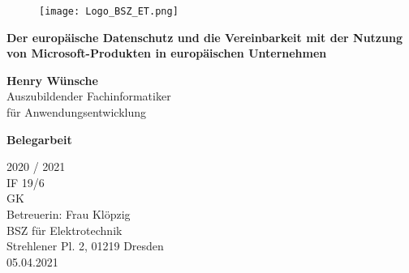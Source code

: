 \begin{titlepage}
    \begin{center}
        \begin{figure}[hbp]
            \begin{center}
                \texttt{[image: Logo\_BSZ\_ET.png]}
            \end{center}
        \end{figure}
        \vspace*{1cm}
        {\huge\textbf{Der europäische Datenschutz und die Vereinbarkeit mit der Nutzung von Microsoft-Produkten in europäischen Unternehmen}}

        \vspace{2cm}

            {\huge\textbf{Henry Wünsche}} \\
            Auszubildender Fachinformatiker \\ für Anwendungsentwicklung

        \vfill
        {\huge\textbf{Belegarbeit}}

        \vspace{1cm}
        {\Huge 2020 / 2021}\\
        \vspace{0.8cm}
        IF 19/6\\
        GK\\
        Betreuerin: Frau Klöpzig\\
        BSZ für Elektrotechnik\\
        Strehlener Pl. 2, 01219 Dresden\\
        05.04.2021
    \end{center}
\end{titlepage}
\pagebreak
